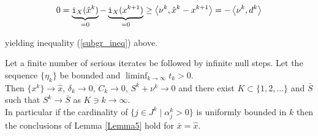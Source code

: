 \[ 0 = \underbrace{\mathtt{i}_X(\hat{x}^k)}_{=0} - \underbrace{\mathtt{i}_X(x^{k+1})}_{=0} \geq \left\langle \nu^k,\hat{x}^k-x^{k+1}\right\rangle = -\left\langle \nu^k,d^k\right\rangle \]

yielding inequality (\ref{subgr_ineq}) above.


\begin{theorem} 
	Let a finite number of serious iterates be followed by infinite null steps. Let the sequence \(\{\eta_k\}\) be bounded and \(\liminf_{k \to \infty} t_k > 0\). \\
	Then \(\{x^k\} \to \hat{x}\), \(\delta_k \to 0\), \(C_k \to 0\), \(S^k + \nu^k \to 0\) and there exist \(K\subset \{1,2,...\}\) and \(\bar{S}\) such that \(S^k \to \bar{S}\) as \(K \ni k \to \infty\). \\
	In particular if the cardinality of \(\{j \in J^k\mid \alpha_j^k > 0 \}\) is uniformly bounded in \(k\) then the conclusions of Lemma \ref{Lemma5} hold for \(\bar{x} = \hat{x}\). 
\end{theorem}

